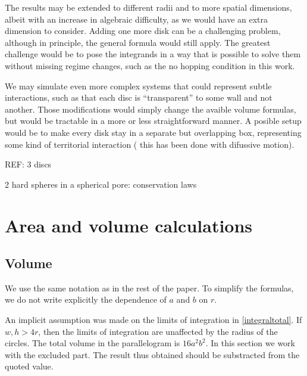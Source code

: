 \documentclass[superscriptaddress,pre,reprint,showpacs,onecolumn]{revtex4-1}
\begin{document}
The results may be extended to different radii and to more spatial dimensions, albeit
with an increase in algebraic difficulty, as we would have an extra dimension
to consider. Adding one more disk can be a challenging problem, although
in principle, the general formula would still apply. The greatest
challenge would be to pose the integrands in a way that is possible
to solve them without missing regime changes, such as the no hopping
condition in this work.

We may simulate even more complex systems that could represent subtle interactions,
such as that each disc is ``transparent'' to some wall and not another. Those
modifications would simply change the avaible volume formulas, but would be
tractable in a more or less straightforward manner. A posible setup would be to
make every disk stay in a separate but overlapping box, representing some kind
of territorial interaction ( this has been done with difussive motion).



REF: 3 discs

2 hard spheres in a spherical pore: conservation laws

\appendix
\section{Area and volume calculations}
\label{app:area_volume}

\subsection{Volume}\label{app:volume}

We use the same notation as in the rest of the paper.
To simplify the formulas, we do not write explicitly the dependence
of $a$ and $b$ on $r$.

An implicit assumption was made on the limits of integration
in \eqref{integraltotal}. If $w, h > 4r$, then the limits of integration
are unaffected by the radius of the circles.
The total volume in the parallelogram is $16a^2b^2$.
In this section we work with the excluded part.
The result thus obtained should be substracted from the
quoted value.
\end{document}
